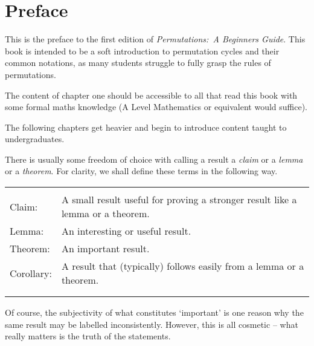 \section*{Preface}\label{sec:preface}


This is the preface to the first edition of \textit{Permutations:~A Beginners Guide}. This book is intended to be a soft introduction to permutation cycles and their common notations, as many students struggle to fully grasp the rules of permutations. %

The content of chapter one should be accessible to all that read this book with some formal maths knowledge (A Level Mathematics or equivalent would suffice).

The following chapters get heavier and begin to introduce content taught to undergraduates.

There is usually some freedom of choice with calling a result a \textit{claim} or a \textit{lemma} or a \textit{theorem}. For clarity, we shall define these terms in the following way.

\begin{table}[h]
    \centering
    \begin{tabular}{ll}\hline\\[-15pt]\hline\\[-12pt]
        Claim:      & A small result useful for proving a stronger result like a lemma or a theorem.\\
        Lemma:      & An interesting or useful result.\\
        Theorem:    & An important result.\\
        Corollary:  & A result that (typically) follows easily from a lemma or a theorem.\\[2pt]
        \hline\\[-15pt]\hline\\
    \end{tabular}
\end{table}\vspace*{-20pt}

Of course, the subjectivity of what constitutes `important' is one reason why the same result may be labelled inconsistently. However, this is all cosmetic -- what really matters is the truth of the statements.
